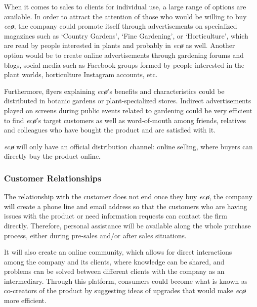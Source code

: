 \documentclass[english,runningheads,a4paper]{llncs}[2018/03/10]
\begin{document}
        When it comes to sales to clients for individual use, a large range of
        options are available. In order to attract the attention of those who
        would be willing to buy \textit{ec\textbf{\o}}, the company could
        promote itself through advertisements on specialized magazines such as
        `Country Gardens', `Fine Gardening', or `Horticulture', which are read
        by people interested in plants and probably in \textit{ec\textbf{\o}} as
        well. Another option would be to create online advertisements through
        gardening forums and blogs, social media such as Facebook groups formed
        by people interested in the plant worlds, horticulture Instagram
        accounts, etc.

        Furthermore, flyers explaining \textit{ec\textbf{\o}}'s benefits and
        characteristics could be distributed in botanic gardens or
        plant-specialized stores. Indirect advertisements played on screens
        during public events related to gardening could be very efficient to
        find \textit{ec\textbf{\o}}'s target customers as well as word-of-mouth
        among friends, relatives and colleagues who have bought the product and
        are satisfied with it.

        \textit{ec\textbf{\o}} will only have an official distribution channel:
        online selling, where buyers can directly buy the product online.


        \subsubsection*{Customer Relationships}

        The relationship with the customer does not end once they buy
        \textit{ec\textbf{\o}}, the company will create a phone line and email
        address so that the customers who are having issues with the product or
        need information requests can contact the firm directly. Therefore,
        personal assistance will be available along the whole purchase process,
        either during pre-sales and/or after sales situations.

        It will also create an online community, which allows for direct
        interactions among the company and its clients, where knowledge can be
        shared, and problems can be solved between different clients with the
        company as an intermediary. Through this platform, consumers could
        become what is known as co-creators of the product by suggesting ideas
        of upgrades that would make \textit{ec\textbf{\o}} more efficient.
\end{document}
